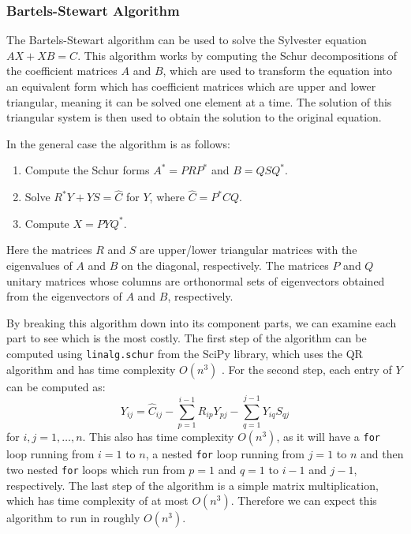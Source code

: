 \documentclass[11pt]{article}
\numberwithin{equation}{section}
\begin{document}
\subsubsection{Bartels-Stewart Algorithm}
The Bartels-Stewart algorithm \cite{Bartels} can be used to solve the Sylvester equation $AX + XB = C$. 
This algorithm works by computing the Schur decompositions of the coefficient matrices $A$ and $B$, which are used to transform the equation into an equivalent form which has coefficient matrices which are upper and lower triangular, meaning it can be solved one element at a time. The solution of this triangular system is then used to obtain the solution to the original equation.

In the general case the algorithm is as follows:
\begin{enumerate}
\item Compute the Schur forms $A^* = PRP^*$ and $B=QSQ^*$.
\item Solve $R^*Y + YS = \hat{C}$ for $Y$, where $\hat{C} = P^*CQ$.
\item Compute $X=PYQ^*$.
\end{enumerate}
Here the matrices $R$ and $S$ are upper/lower triangular matrices with the eigenvalues of $A$ and $B$ on the diagonal, respectively. The matrices $P$ and $Q$ unitary matrices whose columns are orthonormal sets of eigenvectors obtained from the eigenvectors of $A$ and $B$, respectively.

By breaking this algorithm down into its component parts, we can examine each part to see which is the most costly. The first step of the algorithm can be computed using \texttt{linalg.schur} from the SciPy library, which uses the QR algorithm and has time complexity $O(n^3)$ \cite{Parlett}. For the second step, each entry of $Y$ can be computed as:
\begin{equation}
Y_{ij} = \hat{C}_{ij} - \sum_{p=1}^{i-1} R_{ip}Y_{pj} - \sum_{q=1}^{j-1} Y_{iq}S_{qj}
\end{equation}
for $i,j=1, \dots, n$. This also has time complexity $O(n^3)$, as it will have a \texttt{for} loop running from $i=1$ to $n$, a nested \texttt{for} loop running from $j=1$ to $n$ and then two nested \texttt{for} loops which run from $p=1$ and $q=1$ to $i-1$ and $j-1$, respectively. The last step of the algorithm is a simple matrix multiplication, which has time complexity of at most $O(n^3)$. Therefore we can expect this algorithm to run in roughly $O(n^3)$. 
\end{document}
